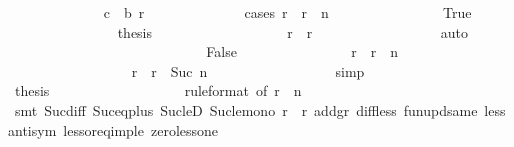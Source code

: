 \begin{isabellebody}
\ \ \ \ \ \ \ \ \ \ \ \ \isamarkupfalse%
\ {\isachardoublequoteopen}c{}\ {\isasymle}\ {\isacharquery}b\ r{\isachardoublequoteclose}\isanewline
\ \ \ \ \ \ \ \ \ \ \ \ \isamarkupfalse%
\ {\isacharparenleft}cases\ {\isachardoublequoteopen}r\ {\isacharless}\ r{}\ {\isacharplus}\ n{\isachardoublequoteclose}{\isacharparenright}\isanewline
\ \ \ \ \ \ \ \ \ \ \ \ \ \ \isamarkupfalse%
\ True\isanewline
\ \ \ \ \ \ \ \ \ \ \ \ \ \ \isamarkupfalse%
\ {\isacharquery}thesis\isanewline
\ \ \ \ \ \ \ \ \ \ \ \ \ \ \ \ \isamarkupfalse%
\ {\isacharasterisk}\ {\isacharbackquoteopen}r{}\ {\isacharless}\ r{\isacharbackquoteclose}\isanewline
\ \ \ \ \ \ \ \ \ \ \ \ \ \ \ \ \isamarkupfalse%
\ auto\isanewline
\ \ \ \ \ \ \ \ \ \ \ \ \isamarkupfalse%
\isanewline
\ \ \ \ \ \ \ \ \ \ \ \ \ \ \isamarkupfalse%
\ False\isanewline
\ \ \ \ \ \ \ \ \ \ \ \ \ \ \isamarkupfalse%
\ {\isachardoublequoteopen}r\ {\isacharequal}\ r{}\ {\isacharplus}\ n{\isachardoublequoteclose}\isanewline
\ \ \ \ \ \ \ \ \ \ \ \ \ \ \ \ \isamarkupfalse%
\ {\isacharbackquoteopen}r\ {\isacharless}\ r{}\ {\isacharplus}\ Suc\ n{\isacharbackquoteclose}\isanewline
\ \ \ \ \ \ \ \ \ \ \ \ \ \ \ \ \isamarkupfalse%
\ simp\isanewline
\ \ \ \ \ \ \ \ \ \ \ \ \ \ \isamarkupfalse%
\ {\isacharquery}thesis\isanewline
\ \ \ \ \ \ \ \ \ \ \ \ \ \ \ \ \isamarkupfalse%
\ {\isacharasterisk}{\isacharparenleft}{}{\isacharparenright}\ {\isacharasterisk}{\isacharparenleft}{}{\isacharparenright}{\isacharbrackleft}rule{\isacharunderscore}format{\isacharcomma}\ of\ {\isachardoublequoteopen}r{}\ {\isacharplus}\ n\ {\isacharminus}\ {}{\isachardoublequoteclose}{\isacharbrackright}\isanewline
\ \ \ \ \ \ \ \ \ \ \ \ \ \ \ \ \isamarkupfalse%
\ {\isacharparenleft}smt\ Suc{\isacharunderscore}diff{\isacharunderscore}{}\ Suc{\isacharunderscore}eq{\isacharunderscore}plus{}\ Suc{\isacharunderscore}leD\ Suc{\isacharunderscore}le{\isacharunderscore}mono\ {\isacartoucheopen}r{}\ {\isacharless}\ r{\isacartoucheclose}\ add{\isacharunderscore}gr{\isacharunderscore}{}\ diff{\isacharunderscore}less\ fun{\isacharunderscore}upd{\isacharunderscore}same\ less{\isacharunderscore}antisym\ less{\isacharunderscore}or{\isacharunderscore}eq{\isacharunderscore}imp{\isacharunderscore}le\ zero{\isacharunderscore}less{\isacharunderscore}one{\isacharparenright}\isanewline

\end{isabellebody}
